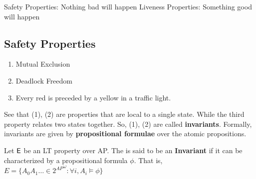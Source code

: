 Safety Properties: Nothing bad will happen
Liveness Properties: Something good will happen

\subsection{Safety Properties}

\begin{enumerate}
\item Mutual Exclusion
\item Deadlock Freedom
\item Every red is preceded by a yellow in a traffic light.
\end{enumerate}

See that (1), (2) are properties that are local to a single state. While the third property relates two states together.
So, (1), (2) are called \textbf{invariants}. Formally, invariants are given by \textbf{propositional formulae} over the atomic propositions.

\begin{definition}
	Let $\mathsf E$ be an LT property over AP. The \E{} is said to be an \textbf{Invariant} if it can be characterized by a propositional formula $\phi$.
	That is, $E = \{ A_0 A_1 \dots \in {2^{AP}}^\omega : \forall i, A_i \models \phi \}$
\end{definition}



